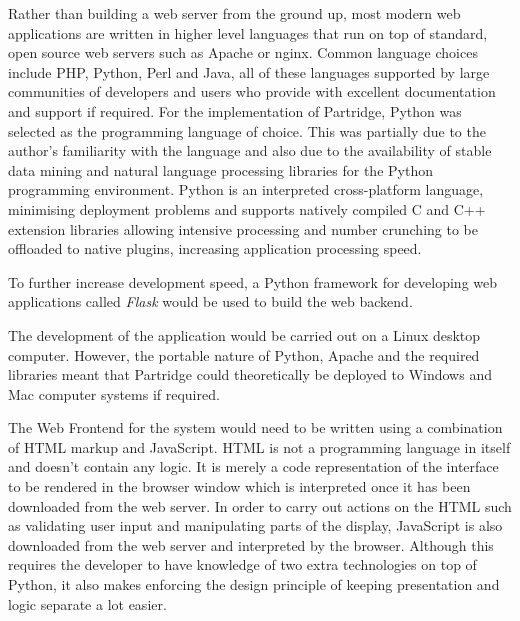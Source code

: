 Rather than building a web server from the ground up, most modern web
applications are written in higher level languages that run on top of standard,
open source web servers such as Apache or nginx. Common language choices
include PHP, Python, Perl and Java, all of these languages supported by large
communities of developers and users who provide with excellent documentation
and support if required.  For the implementation of Partridge, Python was
selected as the programming language of choice. This was partially due to the
author's familiarity with the language and also due to the availability of
stable data mining\cite{curk05} and natural language
processing\cite{bird2009natural} libraries for the Python programming
environment. Python is an interpreted cross-platform language, minimising
deployment problems and supports natively compiled C and C++ extension
libraries allowing intensive processing  and number crunching to be offloaded
to native plugins, increasing application processing speed.

To further increase development speed, a Python framework for developing web
applications called \emph{Flask\cite{flask2012}} would be used to build the web
backend.

The development of the application would be carried out on a Linux desktop
computer. However, the portable nature of Python, Apache and the required
libraries meant that Partridge could theoretically be deployed to Windows and
Mac computer systems if required.

The Web Frontend for the system would need to be written using a combination of
HTML markup and JavaScript. HTML is not a programming language in itself and
doesn't contain any logic. It is merely a code representation of the interface
to be rendered in the browser window which is interpreted once it has been
downloaded from the web server. In order to carry out actions on the HTML such
as validating user input and manipulating parts of the display, JavaScript is
also downloaded from the web server and interpreted by the browser. Although
this requires the developer to have knowledge of two extra technologies on top
of Python, it also makes enforcing the design principle of keeping presentation
and logic separate a lot easier.

